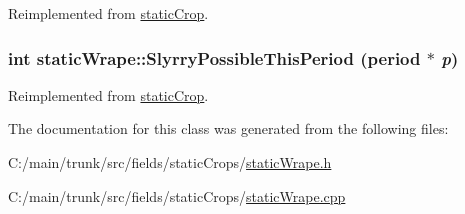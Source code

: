 Reimplemented from \hyperlink{classstatic_crop_ae4f07498c1616eab212386faf352d348}{staticCrop}.\hypertarget{classstatic_wrape_aa71a6c10b4067dacffa833af07a04d8f}{
\subsubsection[{SlyrryPossibleThisPeriod}]{\setlength{\rightskip}{0pt plus 5cm}int staticWrape::SlyrryPossibleThisPeriod ({\bf period} $\ast$ {\em p})}}
\label{classstatic_wrape_aa71a6c10b4067dacffa833af07a04d8f}


Reimplemented from \hyperlink{classstatic_crop_ada7c8c797de629277a5ba0b0a4a3c17e}{staticCrop}.

The documentation for this class was generated from the following files:\begin{DoxyCompactItemize}
\item 
C:/main/trunk/src/fields/staticCrops/\hyperlink{static_wrape_8h}{staticWrape.h}\item 
C:/main/trunk/src/fields/staticCrops/\hyperlink{static_wrape_8cpp}{staticWrape.cpp}\end{DoxyCompactItemize}
